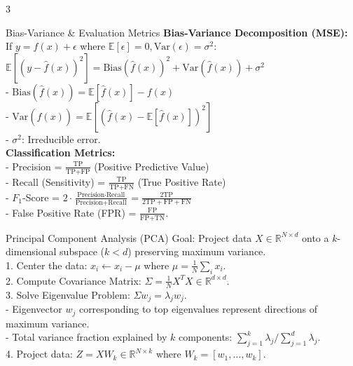 \documentclass[10pt]{article}
\begin{document}
\begin{multicols*}{3}
\begin{mlBox}{Bias-Variance \& Evaluation Metrics}
\textbf{Bias-Variance Decomposition (MSE):} \\
If $y = f(x) + \epsilon$ where $\mathbb{E}[\epsilon] = 0, \text{Var}(\epsilon) = \sigma^2$: \\
$\mathbb{E}[(y - \hat{f}(x))^2] = \text{Bias}(\hat{f}(x))^2 + \text{Var}(\hat{f}(x)) + \sigma^2$ \\
- $\text{Bias}(\hat{f}(x)) = \mathbb{E}[\hat{f}(x)] - f(x)$ \\
- $\text{Var}(\hat{f}(x)) = \mathbb{E}[(\hat{f}(x) - \mathbb{E}[\hat{f}(x)])^2]$ \\
- $\sigma^2$: Irreducible error. \\
\textbf{Classification Metrics:} \\
- Precision = $\frac{\text{TP}}{\text{TP} + \text{FP}}$ \quad (Positive Predictive Value) \\
- Recall (Sensitivity) = $\frac{\text{TP}}{\text{TP} + \text{FN}}$ \quad (True Positive Rate) \\
- $F_1$-Score = $2 \cdot \frac{\text{Precision} \cdot \text{Recall}}{\text{Precision} + \text{Recall}} = \frac{2\text{TP}}{2\text{TP} + \text{FP} + \text{FN}}$ \\
- False Positive Rate (FPR) = $\frac{\text{FP}}{\text{FP} + \text{TN}}$.
\end{mlBox}

\begin{mlBox}{Principal Component Analysis (PCA)}
Goal: Project data $X \in \mathbb{R}^{N \times d}$ onto a $k$-dimensional subspace ($k < d$) preserving maximum variance. \\
1. Center the data: $x_i \leftarrow x_i - \mu$ where $\mu = \frac{1}{N}\sum_i x_i$. \\
2. Compute Covariance Matrix: $\Sigma = \frac{1}{N} X^T X \in \mathbb{R}^{d \times d}$. \\
3. Solve Eigenvalue Problem: $\Sigma w_j = \lambda_j w_j$. \\
- Eigenvector $w_j$ corresponding to top eigenvalues represent directions of maximum variance. \\
- Total variance fraction explained by $k$ components: $\sum_{j=1}^k \lambda_j / \sum_{j=1}^d \lambda_j$. \\
4. Project data: $Z = X W_k \in \mathbb{R}^{N \times k}$ where $W_k = [w_1, \dots, w_k]$.
\end{mlBox}


\end{multicols*}
\end{document}
